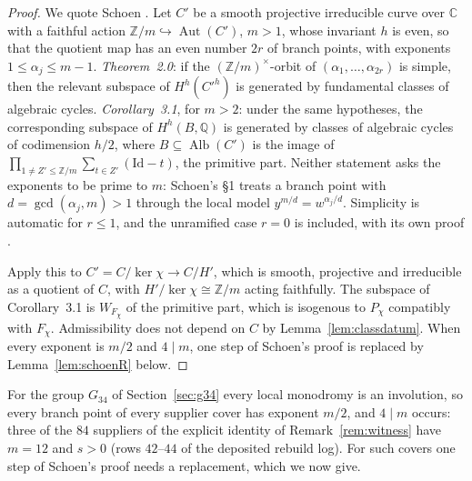 \documentclass[11pt]{amsart}
\theoremstyle{definition}
\theoremstyle{remark}
\newcommand{\Q}{\mathbb Q}
\newcommand{\Z}{\mathbb Z}
\newcommand{\C}{\mathbb C}
\begin{document}
\begin{proof}
We quote Schoen \cite[\S2]{Schoen88}. Let $C'$ be a smooth projective irreducible curve over $\C$ with a faithful action $\Z/m\hookrightarrow\operatorname{Aut}(C')$, $m>1$, whose invariant $h$ is even, so that the quotient map has an even number $2r$ of branch points, with exponents $1\le\alpha_j\le m-1$. \emph{Theorem~2.0}: if the $(\Z/m)^\times$-orbit of $(\alpha_1,\dots,\alpha_{2r})$ is simple, then the relevant subspace of $H^h(C'^h)$ is generated by fundamental classes of algebraic cycles. \emph{Corollary~3.1}, for $m>2$: under the same hypotheses, the corresponding subspace of $H^h(B,\Q)$ is generated by classes of algebraic cycles of codimension $h/2$, where $B\subseteq\operatorname{Alb}(C')$ is the image of $\prod_{1\ne Z'\le\Z/m}\sum_{t\in Z'}(\mathrm{Id}-t)$, the primitive part. Neither statement asks the exponents to be prime to $m$: Schoen's \S1 treats a branch point with $d=\gcd(\alpha_j,m)>1$ through the local model $y^{m/d}=w^{\alpha_j/d}$. Simplicity is automatic for $r\le1$, and the unramified case $r=0$ is included, with its own proof \cite[\S2]{Schoen88}.

Apply this to $C'=C/\ker\chi\to C/H'$, which is smooth, projective and irreducible as a quotient of $C$, with $H'/\ker\chi\cong\Z/m$ acting faithfully. The subspace of Corollary~3.1 is $W_{F_\chi}$ of the primitive part, which is isogenous to $P_\chi$ compatibly with $F_\chi$. Admissibility does not depend on $C$ by Lemma~\ref{lem:classdatum}. When every exponent is $m/2$ and $4\mid m$, one step of Schoen's proof is replaced by Lemma~\ref{lem:schoenR} below.
\end{proof}

For the group $G_{34}$ of Section~\ref{sec:g34} every local monodromy is an involution, so every branch point of every supplier cover has exponent $m/2$, and $4\mid m$ occurs: three of the $84$ suppliers of the explicit identity of Remark~\ref{rem:witness} have $m=12$ and $s>0$ (rows $42$--$44$ of the deposited rebuild log). For such covers one step of Schoen's proof needs a replacement, which we now give.
\end{document}
